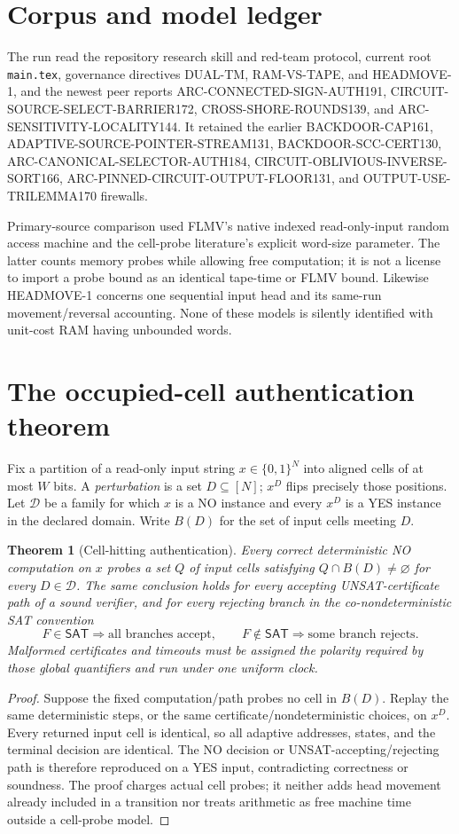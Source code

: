 \documentclass[11pt]{article}
\newtheorem{theorem}{Theorem}
\newcommand{\SAT}{\mathsf{SAT}}
\begin{document}
\section{Corpus and model ledger}
The run read the repository research skill and red-team protocol, current
root \texttt{main.tex}, governance directives DUAL-TM, RAM-VS-TAPE, and
HEADMOVE-1, and the newest peer reports ARC-CONNECTED-SIGN-AUTH191,
CIRCUIT-SOURCE-SELECT-BARRIER172, CROSS-SHORE-ROUNDS139, and
ARC-SENSITIVITY-LOCALITY144.  It retained the earlier BACKDOOR-CAP161,
ADAPTIVE-SOURCE-POINTER-STREAM131, BACKDOOR-SCC-CERT130,
ARC-CANONICAL-SELECTOR-AUTH184, CIRCUIT-OBLIVIOUS-INVERSE-SORT166,
ARC-PINNED-CIRCUIT-OUTPUT-FLOOR131, and OUTPUT-USE-TRILEMMA170 firewalls.

Primary-source comparison used FLMV's native indexed read-only-input random
access machine and the cell-probe literature's explicit word-size parameter.
The latter counts memory probes while allowing free computation; it is not a
license to import a probe bound as an identical tape-time or FLMV bound.
Likewise HEADMOVE-1 concerns one sequential input head and its same-run
movement/reversal accounting.  None of these models is silently identified
with unit-cost RAM having unbounded words.

\section{The occupied-cell authentication theorem}
Fix a partition of a read-only input string $x\in\{0,1\}^N$ into aligned
cells of at most $W$ bits.  A \emph{perturbation} is a set $D\subseteq[N]$;
$x^D$ flips precisely those positions.  Let $\mathcal D$ be a family for
which $x$ is a NO instance and every $x^D$ is a YES instance in the declared
domain.  Write $B(D)$ for the set of input cells meeting $D$.

\begin{theorem}[Cell-hitting authentication]\label{th:hit}
Every correct deterministic NO computation on $x$ probes a set $Q$ of input
cells satisfying $Q\cap B(D)\ne\varnothing$ for every $D\in\mathcal D$.
The same conclusion holds for every accepting UNSAT-certificate path of a
sound verifier, and for every rejecting branch in the co-nondeterministic SAT
convention
\[
 F\in\SAT\Rightarrow\text{all branches accept},\qquad
 F\notin\SAT\Rightarrow\text{some branch rejects}.
\]
Malformed certificates and timeouts must be assigned the polarity required
by those global quantifiers and run under one uniform clock.
\end{theorem}
\begin{proof}
Suppose the fixed computation/path probes no cell in $B(D)$.  Replay the same
deterministic steps, or the same certificate/nondeterministic choices, on
$x^D$.  Every returned input cell is identical, so all adaptive addresses,
states, and the terminal decision are identical.  The NO decision or
UNSAT-accepting/rejecting path is therefore reproduced on a YES input,
contradicting correctness or soundness.  The proof charges actual cell
probes; it neither adds head movement already included in a transition nor
treats arithmetic as free machine time outside a cell-probe model.
\end{proof}
\end{document}
